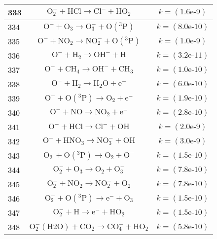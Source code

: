 \begin{longtable}{| m{} | m{}| m{} |}
\hline
 333 & $$ \mathrm{O_2^-} + \mathrm{HCl}\longrightarrow \mathrm{Cl^-} + \mathrm{HO_2} $$ & $$k = (\textrm{1.6e-9}) $$ \\
\hline
 334 & $$ \mathrm{O^-} + \mathrm{O_3}\longrightarrow \mathrm{O_3^-} + \mathrm{O(^3P)} $$ & $$k = (\textrm{8.0e-10}) $$ \\
\hline
 335 & $$ \mathrm{O^-} + \mathrm{NO_2}\longrightarrow \mathrm{NO_2^-} + \mathrm{O(^3P)} $$ & $$k = (\textrm{1.0e-9}) $$ \\
\hline
 336 & $$ \mathrm{O^-} + \mathrm{H_2}\longrightarrow \mathrm{OH^-} + \mathrm{H} $$ & $$k = (\textrm{3.2e-11}) $$ \\
\hline
 337 & $$ \mathrm{O^-} + \mathrm{CH_4}\longrightarrow \mathrm{OH^-} + \mathrm{CH_3} $$ & $$k = (\textrm{1.0e-10}) $$ \\
\hline
 338 & $$ \mathrm{O^-} + \mathrm{H_2}\longrightarrow \mathrm{H_2O} + \mathrm{e^-} $$ & $$k = (\textrm{6.0e-10}) $$ \\
\hline
 339 & $$ \mathrm{O^-} + \mathrm{O(^3P)}\longrightarrow \mathrm{O_2} + \mathrm{e^-} $$ & $$k = (\textrm{1.9e-10}) $$ \\
\hline
 340 & $$ \mathrm{O^-} + \mathrm{NO}\longrightarrow \mathrm{NO_2} + \mathrm{e^-} $$ & $$k = (\textrm{2.8e-10}) $$ \\
\hline
 341 & $$ \mathrm{O^-} + \mathrm{HCl}\longrightarrow \mathrm{Cl^-} + \mathrm{OH} $$ & $$k = (\textrm{2.0e-9}) $$ \\
\hline
 342 & $$ \mathrm{O^-} + \mathrm{HNO_3}\longrightarrow \mathrm{NO_3^-} + \mathrm{OH} $$ & $$k = (\textrm{3.0e-9}) $$ \\
\hline
 343 & $$ \mathrm{O_2^-} + \mathrm{O(^3P)}\longrightarrow \mathrm{O_2} + \mathrm{O^-} $$ & $$k = (\textrm{1.5e-10}) $$ \\
\hline
 344 & $$ \mathrm{O_2^-} + \mathrm{O_3}\longrightarrow \mathrm{O_2} + \mathrm{O_3^-} $$ & $$k = (\textrm{7.8e-10}) $$ \\
\hline
 345 & $$ \mathrm{O_2^-} + \mathrm{NO_2}\longrightarrow \mathrm{NO_2^-} + \mathrm{O_2} $$ & $$k = (\textrm{7.8e-10}) $$ \\
\hline
 346 & $$ \mathrm{O_2^-} + \mathrm{O(^3P)}\longrightarrow \mathrm{e^-} + \mathrm{O_3} $$ & $$k = (\textrm{1.5e-10}) $$ \\
\hline
 347 & $$ \mathrm{O_2^-} + \mathrm{H}\longrightarrow \mathrm{e^-} + \mathrm{HO_2} $$ & $$k = (\textrm{1.5e-10}) $$ \\
\hline
 348 & $$ \mathrm{O_2^-(H2O)} + \mathrm{CO_2}\longrightarrow \mathrm{CO_4^-} + \mathrm{HO_2} $$ & $$k = (\textrm{5.8e-10}) $$ \\

\end{longtable}
